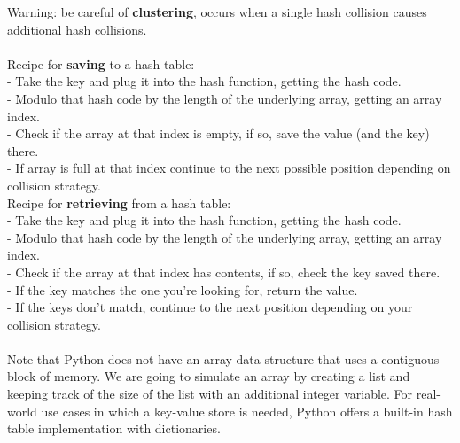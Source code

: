 \documentclass[11pt, a4paper]{article}
\begin{document}
\begin{spacing}{1.1}
	Warning: be careful of \textbf{clustering}, occurs when a single hash collision causes additional hash collisions. \\~\\
	Recipe for \textbf{saving} to a hash table: \\
	\hspace*{2mm} - Take the key and plug it into the hash function, getting the hash code. \\
	\hspace*{2mm} - Modulo that hash code by the length of the underlying array, getting an array index. \\
	\hspace*{2mm} - Check if the array at that index is empty, if so, save the value (and the key) there. \\
	\hspace*{2mm} - If array is full at that index continue to the next possible position depending on collision strategy. \vspace*{2mm} \\
	Recipe for \textbf{retrieving} from a hash table: \\
	\hspace*{2mm} - Take the key and plug it into the hash function, getting the hash code. \\
	\hspace*{2mm} - Modulo that hash code by the length of the underlying array, getting an array index. \\
	\hspace*{2mm} - Check if the array at that index has contents, if so, check the key saved there. \\
	\hspace*{2mm} - If the key matches the one you're looking for, return the value. \\
	\hspace*{2mm} - If the keys don't match, continue to the next position depending on your collision strategy. \\~\\
	Note that Python does not have an array data structure that uses a contiguous block of memory. We are going to simulate an array by creating a list and keeping track of the size of the list with an additional integer variable.  For real-world use cases in which a key-value store is needed, Python offers a built-in hash table implementation with dictionaries. \newpage
	\begin{lstlisting}
	

\end{lstlisting}
\end{spacing}
\end{document}
